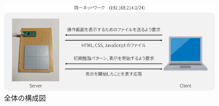\documentclass{jlreq}
\begin{document}
\begin{figure}[h]
    \begin{center}
        \includegraphics[width=120mm]{img/structure.png}
    \end{center}
    \caption{全体の構成図}
    \label{img:structure}
\end{figure}
\end{document}
